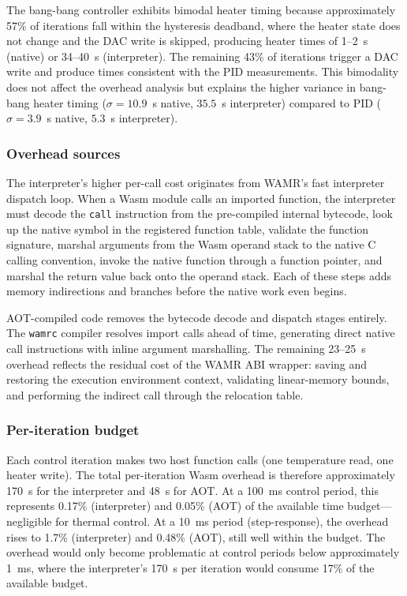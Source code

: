 \documentclass[12pt, a4paper]{report}
\begin{document}
The bang-bang controller exhibits bimodal heater timing because approximately 57\% of iterations fall within the hysteresis deadband, where the heater state does not change and the DAC write is skipped, producing heater times of 1--2~\textmu{}s (native) or 34--40~\textmu{}s (interpreter). The remaining 43\% of iterations trigger a DAC write and produce times consistent with the PID measurements. This bimodality does not affect the overhead analysis but explains the higher variance in bang-bang heater timing ($\sigma = 10.9$~\textmu{}s native, $35.5$~\textmu{}s interpreter) compared to PID ($\sigma = 3.9$~\textmu{}s native, $5.3$~\textmu{}s interpreter).

\subsubsection{Overhead sources}
\label{subsec:overhead-sources}

The interpreter's higher per-call cost originates from WAMR's fast interpreter dispatch loop. When a Wasm module calls an imported function, the interpreter must decode the \texttt{call} instruction from the pre-compiled internal bytecode, look up the native symbol in the registered function table, validate the function signature, marshal arguments from the Wasm operand stack to the native C calling convention, invoke the native function through a function pointer, and marshal the return value back onto the operand stack. Each of these steps adds memory indirections and branches before the native work even begins.

AOT-compiled code removes the bytecode decode and dispatch stages entirely. The \texttt{wamrc} compiler resolves import calls ahead of time, generating direct native call instructions with inline argument marshalling. The remaining 23--25~\textmu{}s overhead reflects the residual cost of the WAMR ABI wrapper: saving and restoring the execution environment context, validating linear-memory bounds, and performing the indirect call through the relocation table.

\subsubsection{Per-iteration budget}
\label{subsec:per-iter-budget}

Each control iteration makes two host function calls (one temperature read, one heater write). The total per-iteration Wasm overhead is therefore approximately 170~\textmu{}s for the interpreter and 48~\textmu{}s for AOT. At a 100~ms control period, this represents 0.17\% (interpreter) and 0.05\% (AOT) of the available time budget---negligible for thermal control. At a 10~ms period (step-response), the overhead rises to 1.7\% (interpreter) and 0.48\% (AOT), still well within the budget. The overhead would only become problematic at control periods below approximately 1~ms, where the interpreter's 170~\textmu{}s per iteration would consume 17\% of the available budget.
\end{document}
